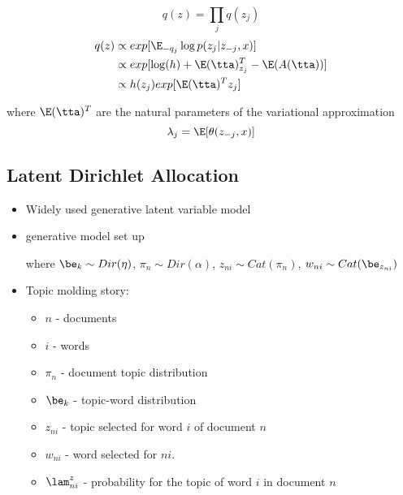 \documentclass{article}
\begin{document}
\[ q(z) = \prod_j q(z_j)\]
\begin{align*}
q(z) &\propto exp[\E_{-q_j} \log p(z_j|z_{-j},x)] \\
&\propto exp[ \log(h) + \E(\tta)_{z_j}^T - \E (A(\tta))] \\
&\propto h(z_j) exp[\E(\tta)^T z_j]
\end{align*}

where $\E(\tta)^T$ are the natural parameters of the variational approximation \newline
\[\lambda_j = \E[\theta(z_{-j},x)]\]

\subsection{Latent Dirichlet Allocation}
\begin{itemize}
\item Widely used generative latent variable model
\item generative model set up
\begin{center}
\end{center}
where $\be_k \sim Dir(\eta)$, $\pi_n \sim Dir(\alpha)$, $z_{ni} \sim Cat(\pi_n)$, $w_{ni} \sim Cat(\be_{z_{ni}})$
\item Topic molding story: 
\begin{itemize}
\item $n$ - documents
\item $i$ - words
\item $\pi_n$ - document topic distribution
\item $\be_k$ - topic-word distribution
\item $z_{ni}$ - topic selected for word $i$ of document $n$ 
\item $w_{ni}$ - word selected for $ni$. 
\item $\lam_{ni}^z$ - probability for the topic of word $i$ in document $n$
\end{itemize}
 


\end{itemize}
\end{document}

